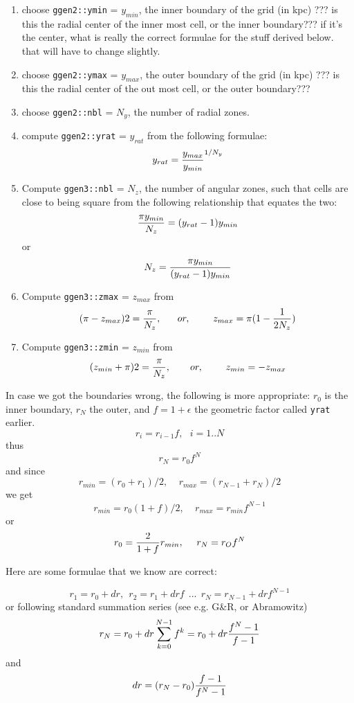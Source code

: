 \documentclass[11pt]{article}
\begin{document}
\begin{enumerate}
\item
choose  {\tt ggen2::ymin} = $y_{min}$, the inner boundary of the grid (in kpc)
??? is this the radial center of the inner most cell, or the inner boundary???
if it's the center, what is really the correct formulae for the stuff derived below.
that will have to change slightly.

\item
choose {\tt ggen2::ymax} = $y_{max}$, the outer boundary of the grid (in kpc)
??? is this the radial center of the out most cell, or the outer boundary???

\item
choose {\tt ggen2::nbl} = $N_y$, the number of radial zones.

\item
compute {\tt ggen2::yrat} = $y_{rat}$ from the following formulae:
$$
	 y_{rat} = {y_{max} \over y_{min}}^{1/{N_y}}
$$

\item
Compute {\tt ggen3::nbl} = $N_z$, the number of angular zones, such that cells are 
close to being square from the following relationship that equates the two:
$$
	{{\pi y_{min}} \over N_z} = (y_{rat} - 1 ) y_{min}
$$
or
$$
N_z =   {  {\pi y_{min}  }   \over  { (y_{rat} - 1 ) y_{min} } }
$$

\item
Compute {\tt ggen3::zmax} = $z_{max}$ from
$$
	( \pi - z_{max} ) 2 = {\pi \over N_z}, ~~~~~ or,~~~~~~~
	z_{max} = \pi ( 1 - {1 \over {2 N_z}})
$$

\item
Compute {\tt ggen3::zmin} = $z_{min}$ from
$$
	( z_{min} + \pi ) 2 = {\pi \over N_z}, ~~~~~~ or,~~~~~~~
	z_{min} = - z_{max} 
$$



\end{enumerate}

In case we got the boundaries wrong, the following is more appropriate: 
$r_0$ is the inner boundary, $r_N$ the outer, and $f=1+\epsilon$ the
geometric factor called {\tt yrat} earlier.
$$
r_i = r_{i-1} f, ~~~ i=1..N
$$
thus
$$
r_N = r_0 f^N
$$
and since
$$
r_{min} = (r_0+r_1)/2,     ~~~~~ r_{max} = (r_{N-1}+r_N)/2
$$
we get
$$
r_{min} = r_0 (1+f)/2,   ~~~~~ r_{max} = r_{min} f^{N-1}
$$
or
$$
r_0 = { 2 \over  { 1+f}}  r_{min}, ~~~~  r_N = r_O f^N
$$


Here are some formulae that we know are correct:

$$
      r_1 = r_0 + dr, ~~  r_2 = r_1 + dr f  ~~...~~ r_N = r_{N-1} + dr f^{N-1}
$$
or following standard summation series (see e.g. G\&R, or Abramowitz)
$$
	r_N = r_0 + dr \sum_{k=0}^{N-1}{f^k} = r_0 + dr { {f^N-1} \over { f - 1 }}
$$
and
$$
     dr =  (r_N - r_0) { {f-1} \over { f^N - 1 }}
$$
\end{document}
